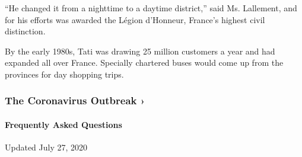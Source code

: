 ``He changed it from a nighttime to a daytime district,'' said Ms.
Lallement, and for his efforts was awarded the Légion d'Honneur,
France's highest civil distinction.

By the early 1980s, Tati was drawing 25 million customers a year and had
expanded all over France. Specially chartered buses would come up from
the provinces for day shopping trips.

\href{https://www.nytimes3xbfgragh.onion/news-event/coronavirus?action=click\&pgtype=Article\&state=default\&region=MAIN_CONTENT_3\&context=storylines_faq}{}

\hypertarget{the-coronavirus-outbreak-}{%
\subsubsection{The Coronavirus Outbreak
›}\label{the-coronavirus-outbreak-}}

\hypertarget{frequently-asked-questions}{%
\paragraph{Frequently Asked
Questions}\label{frequently-asked-questions}}

Updated July 27, 2020

